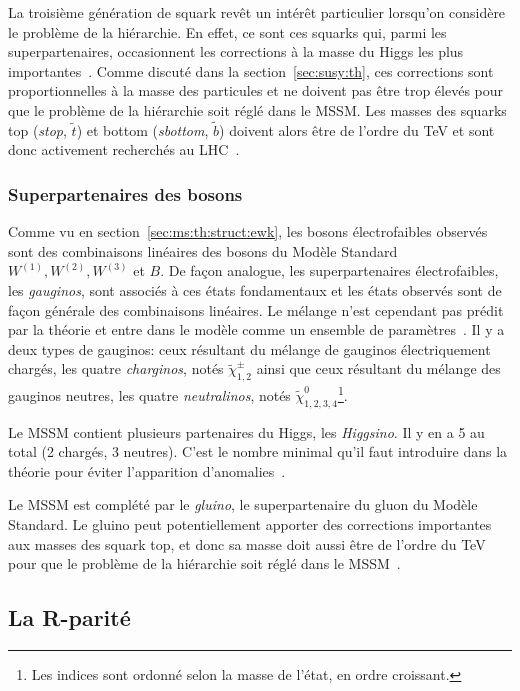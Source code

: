 La troisième génération de squark revêt un intérêt particulier
lorsqu'on considère le problème de la hiérarchie. En effet, ce sont
ces squarks qui, parmi les superpartenaires, occasionnent les
corrections à la masse du Higgs les plus
importantes~\cite{olive_susy2_2014}. Comme discuté dans la
section~\ref{sec:susy:th}, ces corrections sont proportionnelles à la
masse des particules et ne doivent pas être trop élevés pour que le
problème de la hiérarchie soit réglé dans le MSSM. Les masses des
squarks top (\emph{stop}, $\tilde{t}$) et bottom (\emph{sbottom},
$\tilde{b}$) doivent alors être de l'ordre du TeV et sont donc
activement recherchés au LHC~\cite{ATLAS-CONF-2015-067}.

\subsubsection{Superpartenaires des bosons}
Comme vu en section~\ref{sec:ms:th:struct:ewk}, les bosons
électrofaibles observés sont des combinaisons linéaires des bosons du
Modèle Standard $W^{(1)}, W^{(2)}, W^{(3)}$ et $B$. De façon analogue,
les superpartenaires électrofaibles, les \emph{gauginos}, sont
associés à ces états fondamentaux et les états observés sont de façon
générale des combinaisons linéaires. Le mélange n'est cependant pas
prédit par la théorie et entre dans le modèle comme un ensemble de
paramètres~\cite{olive_susy1_2014}. Il y a deux types de gauginos:
ceux résultant du mélange de gauginos électriquement chargés, les
quatre \emph{charginos}, notés $\tilde{\chi}_{1,2}^\pm$ ainsi que ceux
résultant du mélange des gauginos neutres, les quatre
\emph{neutralinos}, notés $\tilde{\chi}_{1,2,3,4}^0$\footnote{Les
  indices sont ordonné selon la masse de l'état, en ordre
  croissant.}\cite{aad_summary_2015}.

Le MSSM contient plusieurs partenaires du Higgs, les
\emph{Higgsino}. Il y en a 5 au total (2 chargés, 3 neutres). C'est le
nombre minimal qu'il faut introduire dans la théorie pour éviter
l'apparition d'anomalies~\cite{olive_susy1_2014}.

Le MSSM est complété par le \emph{gluino}, le superpartenaire du gluon
du Modèle Standard. Le gluino peut potentiellement apporter des
corrections importantes aux masses des squark top, et donc sa masse
doit aussi être de l'ordre du TeV pour que le problème de la
hiérarchie soit réglé dans le MSSM~\cite{ATLAS-CONF-2015-067}.

\subsection{La R-parité}
\label{sec:susy:R}

